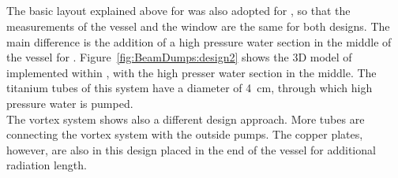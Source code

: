 \subsection{\designtwo}
\label{BeamDumps:design:design2}
The basic layout explained above for \designone was also adopted for \designtwo, so that the measurements of the vessel and the window are the same for both designs.
The main difference is the addition of a high pressure water section in the middle of the vessel  for \designtwo.
Figure~\ref{fig:BeamDumps:design2} shows the 3D model of \designtwo implemented within \flair, with the high presser water section in the middle. 
The titanium tubes of this system have a diameter of \SI{4}{\centi\meter}, through which high pressure water is pumped.
\\The vortex system shows also a different design approach.
More tubes are connecting the vortex system with the outside pumps.
The copper plates, however, are also in this design placed in the end of the vessel for additional radiation length.

